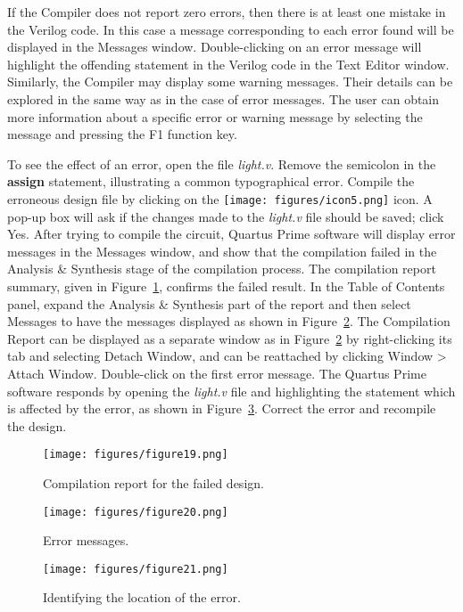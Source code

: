 If the Compiler does not report zero errors, then there is at least one mistake 
in the Verilog code. In this case a message corresponding to each error found will
be displayed in the Messages window.  Double-clicking on an error message will highlight 
the offending statement in the Verilog code in the Text Editor window. 
Similarly, the Compiler may display some warning messages. Their details can be
explored in the same way as in the case of error messages.
The user can obtain more information about a specific error or warning message
by selecting the message and pressing the {\sf F1} function key.

To see the effect of an error, open the file {\it light.v}.  Remove the semicolon in the 
{\bf assign} statement, illustrating a common typographical error.
Compile the erroneous design file by clicking on the 
\texttt{[image: figures/icon5.png]} icon.
A pop-up box will ask if the changes made to the {\it light.v} file should be saved;
click {\sf Yes}. After trying to compile the circuit,
Quartus Prime software will display error messages in the Messages window, and 
show that the compilation failed in the {\sf Analysis \& Synthesis} stage of the compilation process.
The compilation report summary, given in Figure~\ref{fig:19}, 
confirms the failed result. In the Table of Contents panel, expand the 
{\sf Analysis \& Synthesis} part of the report
and then select {\sf Messages} to have the messages displayed as shown in Figure~\ref{fig:20}.
The Compilation Report can be displayed as a separate window as in Figure~\ref{fig:20} 
by right-clicking its tab and selecting {\sf Detach Window}, and can be reattached by clicking
{\sf Window > Attach Window}. Double-click on the first error message. 
The Quartus Prime software responds by opening the {\it light.v}
file and highlighting the statement which is affected by the error,
as shown in Figure~\ref{fig:21}.
Correct the error and recompile the design.

\begin{figure}[H]
   \begin{center}
      \texttt{[image: figures/figure19.png]}
   \caption{Compilation report for the failed design.} 
	 \label{fig:19}
	 \end{center}
\end{figure}

\begin{figure}[H]
   \begin{center}
      \texttt{[image: figures/figure20.png]}
   \caption{Error messages.}
	 \label{fig:20}
	 \end{center}
\end{figure}

\begin{figure}[H]
   \begin{center}
      \texttt{[image: figures/figure21.png]}
   \caption{Identifying the location of the error.} 
	 \label{fig:21}
	 \end{center}
\end{figure}
